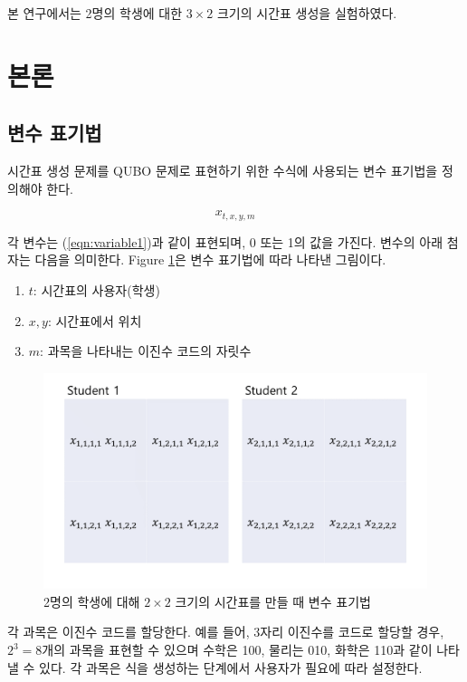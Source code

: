 \documentclass{article}
\begin{document}
본 연구에서는 2명의 학생에 대한 $3\times2$ 크기의 시간표 생성을 실험하였다. 

\section{본론}\label{sec:main}

\subsection{변수 표기법}

시간표 생성 문제를 QUBO 문제로 표현하기 위한 수식에 사용되는 변수 표기법을 정의해야 한다.

    \begin{equation}\label{eqn:variable1}
        x_{t,x,y,m}
    \end{equation}

각 변수는 (\ref{eqn:variable1})과 같이 표현되며, 0 또는 1의 값을 가진다. 변수의 아래 첨자는 다음을 의미한다. Figure \ref{fig:variable}은 변수 표기법에 따라 나타낸 그림이다.

    \begin{enumerate}
        \item [] $t$: 시간표의 사용자(학생)
        \item [] $x,y$: 시간표에서 위치
        \item [] $m$: 과목을 나타내는 이진수 코드의 자릿수
    \end{enumerate}

    \begin{figure}
        \centering
        \includegraphics[width=0.8\columnwidth]{images/var1.png}
        \caption{2명의 학생에 대해 $2 \times 2$ 크기의 시간표를 만들 때 변수 표기법}
        \label{fig:variable}
    \end{figure}

각 과목은 이진수 코드를 할당한다. 예를 들어, 3자리 이진수를 코드로 할당할 경우, $2^{3}=8$개의 과목을 표현할 수 있으며 수학은 100, 물리는 010, 화학은 110과 같이 나타낼 수 있다. 각 과목은 식을 생성하는 단계에서 사용자가 필요에 따라 설정한다.
\end{document}
